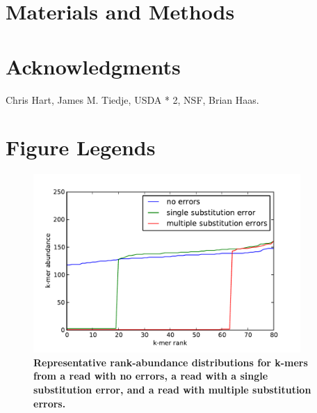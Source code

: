 \documentclass[10pt]{article}
\begin{document}
\section*{Materials and Methods}

\section*{Acknowledgments}

Chris Hart, James M. Tiedje, USDA * 2, NSF, Brian Haas.



\newpage

\section*{Figure Legends}

\begin{figure}
\centerline{\includegraphics[width=4in]{diginorm-ranks.pdf}}
\caption{
{\bf Representative rank-abundance distributions for k-mers from a read with no errors,
a read with a single substitution error, and a read with multiple
substitution errors.}}
\label{fig:rankabund}
\end{figure}
\end{document}

